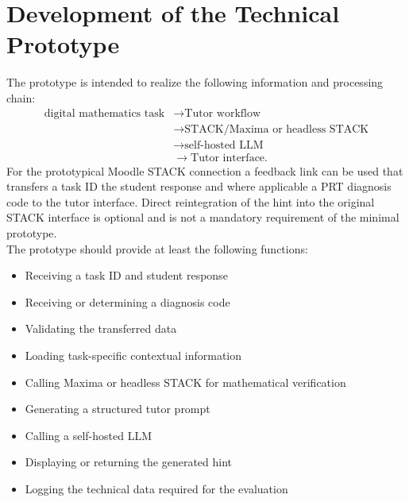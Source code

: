 \documentclass[11pt,a4paper,oneside,ngerman]{memoir}
\begin{document}
\section{Development of the Technical Prototype}
The prototype is intended to realize the following information and processing chain:
\[
\begin{aligned}
\text{digital mathematics task}
&\rightarrow \text{Tutor workflow} \\
&\rightarrow \text{STACK/Maxima or headless STACK} \\
&\rightarrow \text{self-hosted LLM} \\
&\rightarrow \text{Tutor interface}.
\end{aligned}
\]
For the prototypical Moodle STACK connection a feedback link can be used that transfers a task ID the student response and where applicable a PRT diagnosis code to the tutor interface. Direct reintegration of the hint into the original STACK interface is optional and is not a mandatory requirement of the minimal prototype.
\hspace{1 cm}\\
The prototype should provide at least the following functions:
\begin{itemize}
    \item Receiving a task ID and student response
    \item Receiving or determining a diagnosis code
    \item Validating the transferred data
    \item Loading task-specific contextual information
    \item Calling Maxima or headless STACK for mathematical verification
    \item Generating a structured tutor prompt
    \item Calling a self-hosted LLM
    \item Displaying or returning the generated hint
    \item Logging the technical data required for the evaluation
\end{itemize}
\end{document}
